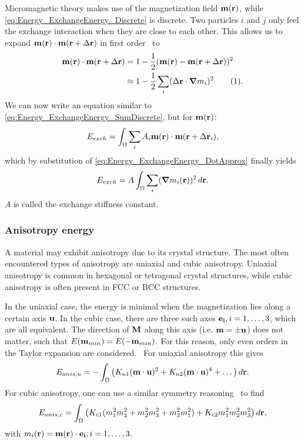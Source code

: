 \documentclass[10pt,a4paper]{article}
\newcommand{\numberthis}{\addtocounter{equation}{1}\tag{\theequation}}
\begin{document}
Micromagnetic theory makes use of the magnetization field $\vb{m}(\vb{r})$, while \cref{eq:Energy_ExchangeEnergy_Discrete} is discrete. Two particles $i$ and $j$ only feel the exchange interaction when they are close to each other. This allows us to expand $\vb{m}(\vb{r}) \cdot \vb{m}(\vb{r} + \Delta\vb{r})$ in first order~\cite{abert2013discrete} to
\begin{align*}
    \vb{m}(\vb{r}) \cdot \vb{m}(\vb{r} + \Delta\vb{r}) &= 1 - \frac{1}{2}(\vb{m}(\vb{r}) - \vb{m}(\vb{r} + \Delta\vb{r}))^2 \\
    &\approx 1 - \frac{1}{2}\sum_i(\Delta\vb{r} \cdot \gradient{m_i})^2 \numberthis \label{eq:Energy_ExchangeEnergy_DotApprox} \mathrm{.}
\end{align*}
We can now write an equation similar to \cref{eq:Energy_ExchangeEnergy_SumDiscrete}, but for $\vb{m}(\vb{r})$:
\begin{equation*}
    E_{exch} = \int_\Omega \sum_i A_i \vb{m}(\vb{r}) \cdot \vb{m}(\vb{r} + \Delta\vb{r}_i) \mathrm{,}
\end{equation*}
which by substitution of \cref{eq:Energy_ExchangeEnergy_DotApprox} finally yields~\cite{abert2013discrete,Gilbert1956}
\begin{equation}
    E_{exch} = A \int_\Omega \sum_i (\gradient{m_i}(\vb{r}))^2 \, d\vb{r} \mathrm{.} \label{eq:Energy_Term_Exchange}
\end{equation}
$A$ is called the exchange stiffness constant.~\cite{Gilbert1956}

\subsubsection{Anisotropy energy}
A material may exhibit anisotropy due to its crystal structure. The most often encountered types of anisotropy are uniaxial and cubic anisotropy. Uniaxial anisotropy is common in hexagonal or tetragonal crystal structures, while cubic anisotropy is often present in FCC or BCC structures.~\cite{Gilbert1956, abert2013discrete} \par
In the uniaxial case, the energy is minimal when the magnetization lies along a certain axis $\vb{u}$. In the cubic case, there are three such axes $\vb{e_i}, i=1,\dots,3$, which are all equivalent. The direction of $\vb{M}$ along this axis (i.e. $\vb{m}=\pm \vb{u}$) does not matter, such that $E(\vb{m}_{min}) = E(-\vb{m}_{min})$. For this reason, only even orders in the Taylor expansion are considered.~\cite{abert2013discrete} For uniaxial anisotropy this gives
\begin{equation}
    E_{anis,u} = - \int_\Omega \big(K_{u1} (\vb{m} \cdot \vb{u})^2 + K_{u2} (\vb{m} \cdot \vb{u})^4 + \dots\big) \, d\vb{r} \mathrm{.} \label{eq:Energy_Term_AnisUniaxial}
\end{equation}
For cubic anisotropy, one can use a similar symmetry reasoning~\cite{abert2013discrete} to find
\begin{equation}
    E_{anis,c} = \int_\Omega \big(K_{c1} (m_1^2m_2^2 + m_2^2m_3^2 + m_3^2m_1^2) + K_{c2} m_1^2m_2^2m_3^2\big) \, d\vb{r} \mathrm{,} \label{eq:Energy_Term_AnisCubic}
\end{equation}
with $m_i(\vb{r}) = \vb{m}(\vb{r}) \cdot \vb{e_i}, i=1,\dots,3$.
\end{document}
